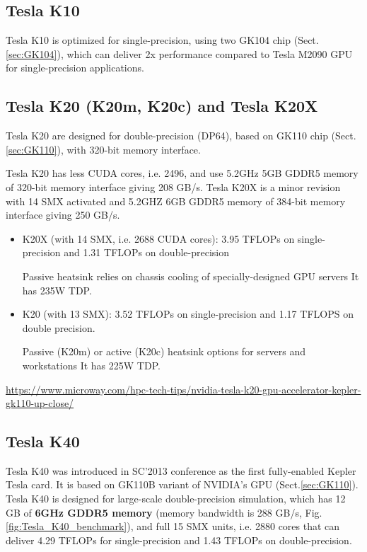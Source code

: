 \subsection{Tesla K10}
\label{sec:K10}

Tesla K10 is optimized for single-precision, using two GK104 chip
(Sect.\ref{sec:GK104}), which can deliver 2x performance compared to Tesla M2090
GPU for single-precision applications.

\subsection{Tesla K20 (K20m, K20c) and Tesla K20X}
\label{sec:K20}

Tesla K20 are designed for double-precision (DP64), based on GK110 chip
(Sect.\ref{sec:GK110}), with 320-bit memory interface. 

Tesla K20 has less CUDA cores, i.e. 2496, and use 5.2GHz 5GB GDDR5 memory
of 320-bit memory interface giving 208 GB/s. Tesla K20X is a minor revision with
14 SMX activated and 5.2GHZ 6GB GDDR5 memory of 384-bit memory interface giving
250 GB/s.

\begin{itemize}
  \item K20X (with 14 SMX, i.e. 2688 CUDA cores): 3.95 TFLOPs on
  single-precision and 1.31 TFLOPs on double-precision
  
Passive heatsink relies on chassis cooling of specially-designed GPU servers  
It has 235W TDP.
  
  \item K20 (with 13 SMX): 3.52 TFLOPs on single-precision and 1.17 TFLOPS on
  double precision.

Passive (K20m) or active (K20c) heatsink options for servers and workstations
It has 225W TDP.

\end{itemize}
\url{https://www.microway.com/hpc-tech-tips/nvidia-tesla-k20-gpu-accelerator-kepler-gk110-up-close/}

\subsection{Tesla K40}
\label{sec:K40}

Tesla K40 was introduced in SC'2013 conference as the first fully-enabled Kepler
Tesla card. It is based on GK110B variant of NVIDIA's GPU
(Sect.\ref{sec:GK110}). Tesla K40 is designed for large-scale double-precision
simulation, which has 12 GB of {\bf 6GHz GDDR5 memory} (memory bandwidth is 288
GB/s, Fig.\ref{fig:Tesla_K40_benchmark}), and full 15 SMX units, i.e. 2880 cores
that can deliver 4.29 TFLOPs for single-precision and 1.43 TFLOPs on
double-precision.


